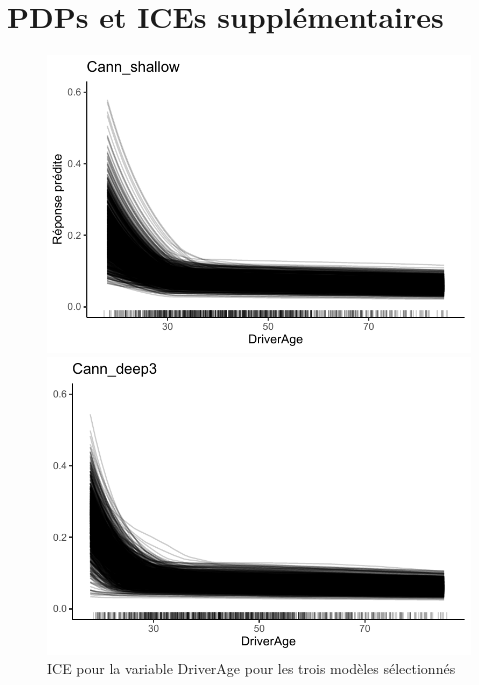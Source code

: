 \chapter{PDPs et ICEs supplémentaires}     %
\label{ann:Graphiques}                   


\begin{figure}
\caption{\label{fig:iceDriverAge} ICE pour la variable DriverAge pour les trois modèles sélectionnés}
\centering
\begin{minipage}{0.45\linewidth}
\includegraphics[scale=0.6]{Graphiques/iceDriverAgeShallow}
\end{minipage}
\hfill
\begin{minipage}{0.45\linewidth}
\includegraphics[scale=0.6]{Graphiques/iceDriverAgeCann}
\end{minipage}
\hfill

\end{figure}
